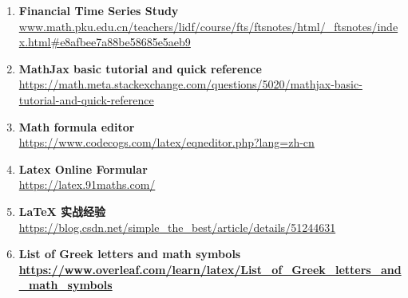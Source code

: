  
\begin{enumerate}
 
        \item\textbf{Financial Time Series Study } \\
        \url{www.math.pku.edu.cn/teachers/lidf/course/fts/ftsnotes/html/_ftsnotes/index.html#e8afbee7a88be58685e5aeb9} 
        
        \item\textbf{MathJax basic tutorial and quick reference  } \\
        \url{https://math.meta.stackexchange.com/questions/5020/mathjax-basic-tutorial-and-quick-reference} 
        
        \item\textbf{Math formula editor} \\
        \url{https://www.codecogs.com/latex/eqneditor.php?lang=zh-cn}  
        
        \item\textbf{Latex Online Formular } \\
        \url{https://latex.91maths.com/} 
  
        \item\textbf{LaTeX 实战经验} \\
        \url{https://blog.csdn.net/simple_the_best/article/details/51244631} 
   
        \item\textbf{List of Greek letters and math symbols  \url{https://www.overleaf.com/learn/latex/List_of_Greek_letters_and_math_symbols}
        }
   
\end{enumerate}
